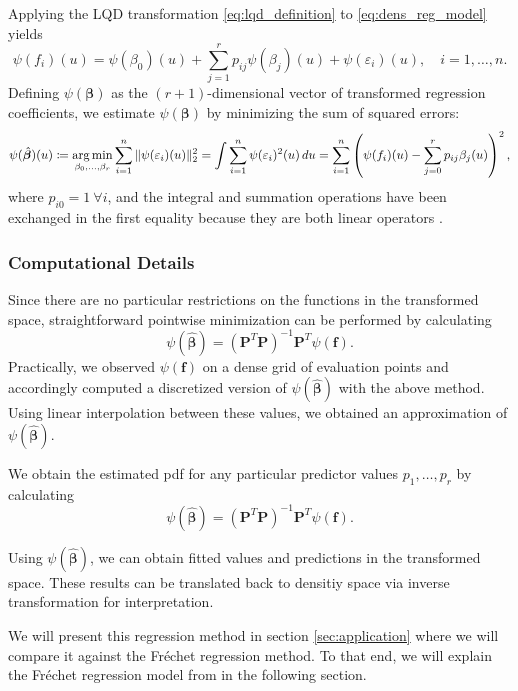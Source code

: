 Applying the LQD transformation \eqref{eq:lqd_definition} to \eqref{eq:dens_reg_model}
yields
\begin{equation}
    \label{eq:lqd_reg_model}
    \psi(f_i)(u) = \psi(\beta_0)(u) + \sum_{j=1}^{r} p_{ij} \psi(\beta_j)(u) + \psi(\varepsilon_i)(u), \quad i = 1, \ldots, n.
\end{equation}
Defining $\psi(\boldsymbol{\beta})$ as the $(r+1)$-dimensional vector of transformed
regression coefficients, we estimate $\psi(\boldsymbol{\beta})$ by minimizing the sum of
squared errors:
\begin{equation}
    \psi(\hat{\boldsymbol{\beta}})(u)
    \coloneqq \operatorname*{arg\,min}_{\beta_0,\dots, \beta_r} \sum_{i=1}^{n} \|\psi(\varepsilon_i) (u)\|_2^2
    = \int \sum_{i=1}^{n} \psi(\varepsilon_i)^2 (u) \, du
    = \sum_{i=1}^{n} \left( \psi(f_i)(u) - \sum_{j=0}^{r} p_{ij} \beta_j(u) \right)^2,
\end{equation}
where $p_{i0} = 1 \ \forall i$, and the integral and summation operations have been
exchanged in the first equality because they are both linear operators
\parencites[cf.][Chapter~13.4]{RamsaySilverman2005}[][Chapter~5.1]{KokoszkaReimherr2017}.

\subsubsection{Computational Details}
\label{sec:com_details_func_reg}
Since there are no particular restrictions on the functions in the transformed space,
straightforward pointwise minimization can be performed by calculating
\begin{equation}
    \psi(\hat{\boldsymbol{\beta}})
    = \left(\mathbf{P}^T \mathbf{P}\right)^{-1} \mathbf{P}^T \psi(\mathbf{f}).
\end{equation}
Practically, we observed $\psi(\mathbf{f})$ on a dense grid of evaluation points and
accordingly computed a discretized version of $\psi(\hat{\boldsymbol{\beta}})$ with the
above method. Using linear interpolation between these values, we obtained an approximation
of $\psi(\hat{\boldsymbol{\beta}})$.

We obtain the estimated pdf for any particular predictor values $p_1, \dots, p_r$ by
calculating
\begin{equation}
    \psi(\hat{\boldsymbol{\beta}})
    = \left(\mathbf{P}^T \mathbf{P}\right)^{-1} \mathbf{P}^T \psi(\mathbf{f}).
\end{equation}

Using $\psi(\hat{\boldsymbol{\beta}})$, we can obtain fitted values and predictions in
the transformed space. These results can be translated back to densitiy space via
inverse transformation for interpretation.

We will present this regression method in section \ref{sec:application} where we will
compare it against the Fréchet regression method. To that end, we will explain the
Fréchet regression model from \textcite{PetersenMüller2019} in the following section.

